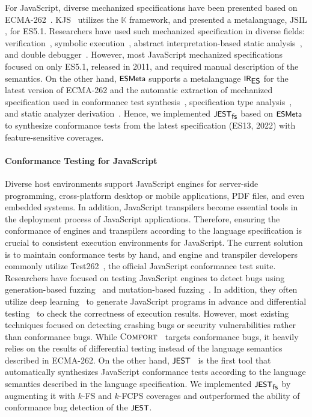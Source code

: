 \documentclass[acmsmall,review,screen]{acmart}
\newcommand{\name}[1]{\textsf{#1}}
\newcommand{\sname}[1]{\name{\small #1}}
\newcommand{\ires}{\sname{IR}_\sname{ES}}
\newcommand{\jest}{\sname{JEST}}
\newcommand{\esmeta}{\sname{ESMeta}}
\newcommand{\jsil}{\text{JSIL}}
\newcommand{\comfort}{\textsc{Comfort}}
\newcommand{\kframework}{\mathbb{K}}
\newcommand{\tool}{\jest_{\sname{fs}}}
\begin{document}

For JavaScript, diverse mechanized specifications have
been presented based on ECMA-262~\cite{es13}.
%
KJS~\cite{kjs} utilizes the $\kframework$ framework, and \citet{javert}
presented a metalanguage, $\jsil$, for ES5.1.
%
Researchers have used such mechanized specification in diverse fields:
verification~\cite{javert}, symbolic execution~\cite{javert2}, abstract
interpretation-based static analysis~\cite{wala, tajs, jsai, safe, safe2}, and
double debugger~\cite{jsexplain}.
%
However, most JavaScript mechanized specifications focused on only ES5.1,
released in 2011, and required manual description of the semantics.
%
On the other hand, $\esmeta$ supports a metalanguage $\ires$ for the latest
version of ECMA-262 and the automatic extraction of mechanized specification
used in conformance test synthesis~\cite{jest}, specification type
analysis~\cite{jstar}, and static analyzer derivation~\cite{jsaver}.
%
Hence, we implemented $\tool$ based on $\esmeta$ to synthesize conformance tests
from the latest specification (ES13, 2022) with feature-sensitive coverages.


\paragraph{\textbf{Conformance Testing for JavaScript}}
%
Diverse host environments support JavaScript engines for server-side
programming, cross-platform desktop or mobile applications, PDF files, and even
embedded systems.
%
In addition, JavaScript transpilers become essential tools in the deployment
process of JavaScript applications.
%
Therefore, ensuring the conformance of engines and transpilers according to the
language specification is crucial to consistent execution environments for
JavaScript.
%
The current solution is to maintain conformance tests by hand, and engine and
transpiler developers commonly utilize Test262~\cite{test262}, the official
JavaScript conformance test suite.
%
Researchers have focused on testing JavaScript engines to detect bugs using
generation-based fuzzing~\cite{die, codealchemist, favocado, sofi} and
mutation-based fuzzing~\cite{die, codealchemist, ifuzzer, superion}.
%
In addition, they often utilize deep learning~\cite{montage, comfort} to
generate JavaScript programs in advance and differential
testing~\cite{jit-picking} to check the correctness of execution results.
%
However, most existing techniques focused on detecting crashing bugs or security
vulnerabilities rather than conformance bugs.
%
While $\comfort$~\cite{comfort} targets conformance bugs, it heavily relies on
the results of differential testing instead of the language semantics described
in ECMA-262.
%
On the other hand, $\jest$~\cite{jest} is the first tool that automatically
synthesizes JavaScript conformance tests according to the language semantics
described in the language specification.
%
We implemented $\tool$ by augmenting it with $k$-FS and $k$-FCPS coverages and
outperformed the ability of conformance bug detection of the $\jest$.
\end{document}
